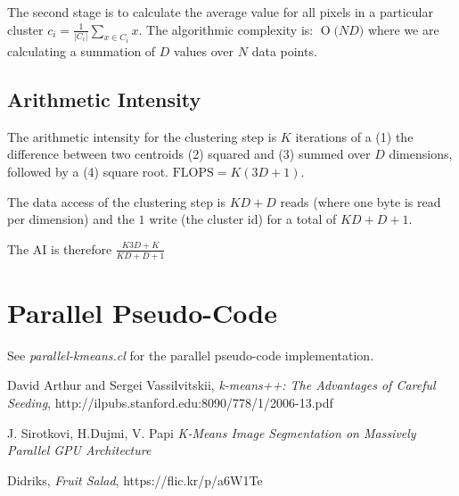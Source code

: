 \documentclass[11pt]{article}
\newcommand{\BigO}[1]{\ensuremath{\operatorname{O}\bigl(#1\bigr)}}
\begin{document}
The second stage is to calculate the average value for all pixels in a particular cluster $c_i = \frac{1}{|C_i|}\sum_{x \in C_i}x$. The algorithmic complexity is: $\BigO{ND}$ where we are calculating a summation of $D$ values over $N$ data points.

\subsection{Arithmetic Intensity}

The arithmetic intensity for the clustering step is $K$ iterations of a (1) the difference between two centroids (2) squared and (3) summed over $D$ dimensions, followed by a (4) square root. $\text{FLOPS} = K(3D+1)$.

The data access of the clustering step is $KD+D$ reads (where one byte is read per dimension) and the $1$ write (the cluster id) for a total of $KD+D+1$.

The AI is therefore $\frac{K3D+K}{KD+D+1}$

\section{Parallel Pseudo-Code}

See \emph{parallel-kmeans.cl} for the parallel pseudo-code implementation.

\begin{thebibliography}{9}

  David Arthur and Sergei Vassilvitskii,
  \emph{k-means++: The Advantages of Careful Seeding},
  http://ilpubs.stanford.edu:8090/778/1/2006-13.pdf

  J. Sirotkovi, H.Dujmi, V. Papi
  \emph{K-Means Image Segmentation on Massively Parallel GPU Architecture}

  Didriks,
  \emph{Fruit Salad},
  https://flic.kr/p/a6W1Te

\end{thebibliography}
\end{document}
